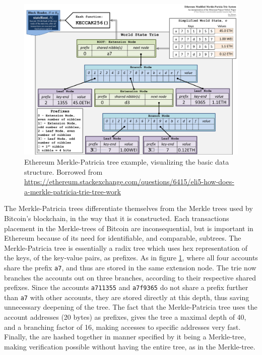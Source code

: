 \documentclass{article}
\begin{document}
			\begin{figure}[!ht]
				\centering
				\includegraphics[scale=0.14]{figures/merkle-patricia-tree.png}
			 	\caption[Ethereum Merkle-Patricia tree example]
			 	{Ethereum Merkle-Patricia tree example, visualizing the basic data structure. Borrowed from \url{https://ethereum.stackexchange.com/questions/6415/eli5-how-does-a-merkle-patricia-trie-tree-work}}
			 	\label{fig:merkle-patricia-tree}
			\end{figure}

			The Merkle-Patricia trees differentiate themselves from the Merkle trees used by Bitcoin's blockchain, in the way that it is constructed.
			Each transactions placement in the Merkle-trees of Bitcoin are inconsequential, but is important in Ethereum because of its need for identifiable, and comparable, subtrees.
			The Merkle-Patricia tree is essentially a radix tree which uses hex representation of the keys, of the key-value pairs, as prefixes.
			As in figure \ref{fig:merkle-patricia-tree}, where all four accounts share the prefix \texttt{a7}, and thus are stored in the same extension node.
			The trie now branches the accounts out on three branches, according to their respective shared prefixes. 
			Since the accounts \texttt{a711355} and \texttt{a7f9365} do not share a prefix further than \texttt{a7} with other accounts, they are stored directly at this depth, thus saving unnecessary deepening of the tree.
			The fact that the Merkle-Patricia tree uses the account addresses (20 bytes) as prefixes, gives the tree a maximal depth of 40, and a branching factor of 16, making accesses to specific addresses very fast.  
			Finally, the are hashed together in manner specified by it being a Merkle-tree, making verification possible without having the entire tree, as in the Merkle-tree.  
\end{document}
